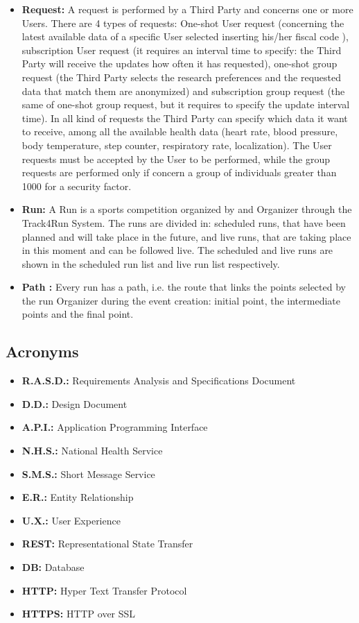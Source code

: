 \begin{itemize}
\item\textbf{Request:} A request is performed by a Third Party and concerns one or more Users. There are 4 types of requests: One-shot User request (concerning the latest available data of a specific User selected inserting his/her fiscal code ), subscription User request (it requires an interval time to specify: the Third Party will receive the updates how often it has requested), one-shot group request (the Third Party selects the research preferences and the requested data that match them are anonymized) and subscription group request (the same of one-shot group request, but it requires to specify the update interval time). In all kind of requests the Third Party can specify which data it want to receive, among all the available health data (heart rate, blood pressure, body temperature, step counter, respiratory rate, localization). The User requests must be accepted by the User to be performed, while the group requests are performed only if concern a group of individuals greater than 1000 for a security factor.

\item\textbf{Run:} A Run is a sports competition organized by and Organizer through the Track4Run System. The runs are divided in: scheduled runs, that have been planned and will take place in the future, and live runs, that are taking place in this moment and can be followed live. The scheduled and live runs are shown in the scheduled run list and live run list respectively.

\item\textbf{Path :} Every run has a path, i.e. the route that links the points selected by the run Organizer during the event creation: initial point, the intermediate points and the final point. 

	\end{itemize}
	
\subsection{Acronyms}

\begin{itemize}
  \item \textbf{R.A.S.D.:} Requirements Analysis and Specifications Document
  \item \textbf{D.D.:} Design Document
  \item \textbf{A.P.I.:} Application Programming Interface 
  \item \textbf{N.H.S.:} National Health Service
  \item \textbf{S.M.S.:} Short Message Service
  \item \textbf{E.R.:} Entity Relationship
  \item \textbf{U.X.:} User Experience 
  \item \textbf{REST:} Representational State Transfer
  \item \textbf{DB:} Database
  \item \textbf{HTTP:} Hyper Text Transfer Protocol
  \item \textbf{HTTPS:} HTTP over SSL
\end{itemize}

